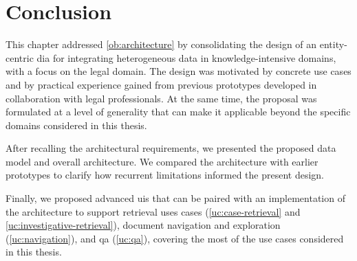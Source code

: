 \section{Conclusion}
\label{sec:arch:conclusion}



This chapter addressed \ref{ob:architecture} by consolidating the design of an entity-centric \acl{dia} for integrating heterogeneous data in knowledge-intensive domains, with a focus on the legal domain. The design was motivated by concrete use cases and by practical experience gained from previous prototypes developed in collaboration with legal professionals. At the same time, the proposal was formulated at a level of generality that can make it applicable beyond the specific domains considered in this thesis.

After recalling the architectural requirements, we presented the proposed data model and overall architecture. We compared the architecture with earlier prototypes to clarify how recurrent limitations informed the present design.

Finally, we proposed advanced \acp{ui} that can be paired with an implementation of the architecture to support retrieval uses cases (\ref{uc:case-retrieval} and \ref{uc:investigative-retrieval}), document navigation and exploration (\ref{uc:navigation}), and \acl{qa} (\ref{uc:qa}), covering the most of the use cases considered in this thesis.
